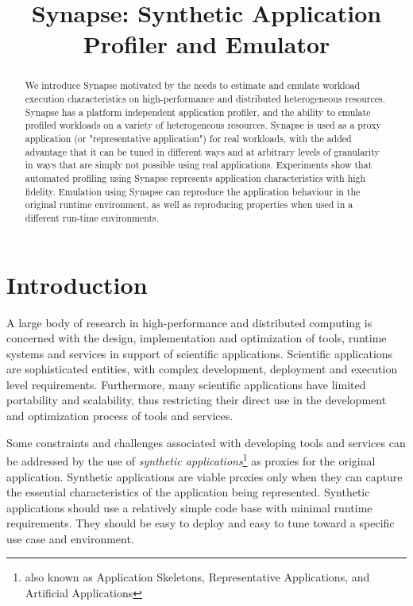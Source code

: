 \documentclass[10pt, conference, compsocconf]{IEEEtran}
\title{Synapse: Synthetic Application Profiler and Emulator}
\author{
  \IEEEauthorblockN{
    Andre Merzky\IEEEauthorrefmark{1},
    Shantenu Jha\IEEEauthorrefmark{1}\\
  }
  \IEEEauthorblockA{
    \IEEEauthorrefmark{1}RADICAL Laboratory, Electric and Computer Engineering, Rutgers University, New Brunswick, NJ, USA
  }
}
\newcommand{\synapse}{Synapse\xspace}
\begin{document}
\maketitle
\begin{abstract}

  We introduce \synapse motivated by the needs to estimate and emulate workload
  execution characteristics on high-performance and distributed heterogeneous
  resources. \synapse has a platform independent application profiler, and the
  ability to emulate profiled workloads on a variety of heterogeneous
  resources. \synapse is used as a proxy application (or "representative
  application") for real workloads, with the added advantage that it can be
  tuned in different ways and at arbitrary levels of granularity in ways that
  are simply not possible using real applications.  Experiments show that
  automated profiling using \synapse represents application characteristics with
  high fidelity. Emulation using \synapse can reproduce the application
  behaviour in the original runtime environment, as well as reproducing properties
  when used in a different run-time environments.






\end{abstract}










\section{Introduction}
\label{sec:intro}





A large body of research in high-performance and distributed computing is
concerned with the design, implementation and optimization of tools, runtime
systems and services in support of scientific applications.  Scientific
applications are sophisticated entities, with complex development, deployment
and execution level requirements.  Furthermore, many scientific applications
have limited portability and scalability, thus restricting their direct use in
the development and optimization process of tools and services.



Some constraints and challenges associated with developing tools and services
can be addressed by the use of {\it synthetic applications}\footnote{also known
  as Application Skeletons, Representative Applications, and Artificial
  Applications} as proxies for the original application.  Synthetic applications
are viable proxies only when they can capture the essential characteristics of
the application being represented.  Synthetic applications should use a
relatively simple code base with minimal runtime requirements.  They should be
easy to deploy and easy to tune toward a specific use case and environment.
\end{document}
